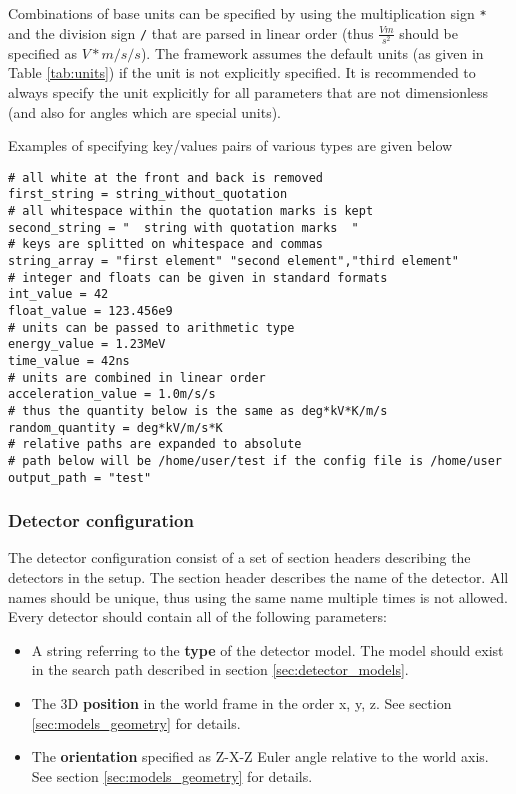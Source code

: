 Combinations of base units can be specified by using the multiplication sign \texttt{*} and the division sign \texttt{/} that are parsed in linear order (thus $\frac{V m}{s^2}$ should be specified as $V*m/s/s$). The framework assumes the default units (as given in Table \ref{tab:units}) if the unit is not explicitly specified. It is recommended to always specify the unit explicitly for all parameters that are not dimensionless (and also for angles which are special units). 

Examples of specifying key/values pairs of various types are given below
\begin{verbatim}
# all white at the front and back is removed
first_string = string_without_quotation
# all whitespace within the quotation marks is kept
second_string = "  string with quotation marks  "
# keys are splitted on whitespace and commas
string_array = "first element" "second element","third element"
# integer and floats can be given in standard formats
int_value = 42
float_value = 123.456e9
# units can be passed to arithmetic type
energy_value = 1.23MeV
time_value = 42ns
# units are combined in linear order
acceleration_value = 1.0m/s/s
# thus the quantity below is the same as deg*kV*K/m/s
random_quantity = deg*kV/m/s*K 
# relative paths are expanded to absolute 
# path below will be /home/user/test if the config file is /home/user
output_path = "test" 
\end{verbatim}

\subsubsection{Detector configuration}
\label{sec:detector_config}
The detector configuration consist of a set of section headers describing the detectors in the setup. The section header describes the name of the detector. All names should be unique, thus using the same name multiple times is not allowed. Every detector should contain all of the following parameters:
\begin{itemize}
\item A string referring to the \textbf{type} of the detector model. The model should exist in the search path described in section \ref{sec:detector_models}.
\item The 3D \textbf{position} in the world frame in the order x, y, z. See section \ref{sec:models_geometry} for details.
\item The \textbf{orientation} specified as Z-X-Z Euler angle relative to the world axis. See section \ref{sec:models_geometry} for details.
\end{itemize}

